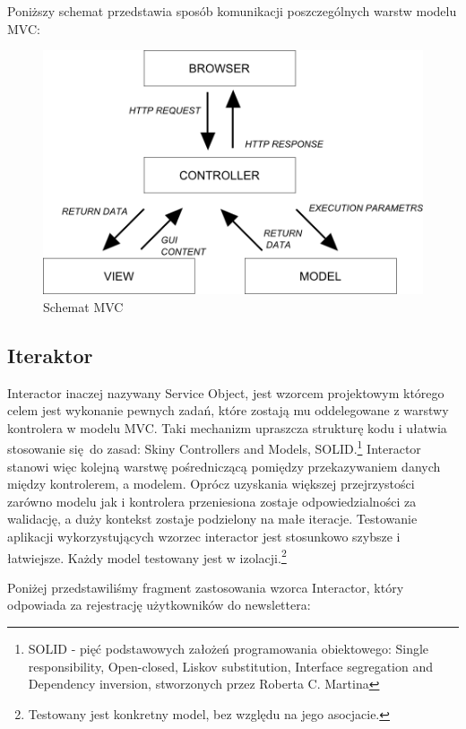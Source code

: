     Poniższy schemat przedstawia sposób komunikacji poszczególnych warstw modelu MVC:
    \begin{figure}[h]
      \centering
      \includegraphics[scale=0.87]{images/mvc_model.png}
      \caption{Schemat MVC}
    \end{figure}
  \subsection{Iteraktor}
  Interactor inaczej nazywany Service Object, jest wzorcem projektowym którego celem jest
  wykonanie pewnych zadań, które zostają mu oddelegowane z warstwy kontrolera w modelu MVC. Taki mechanizm upraszcza strukturę kodu i ułatwia stosowanie się do zasad: Skiny Controllers and Models, SOLID.\footnote{SOLID - pięć podstawowych założeń programowania obiektowego: Single responsibility, Open-closed, Liskov substitution, Interface segregation and Dependency inversion,  stworzonych przez Roberta C. Martina}
  Interactor stanowi więc kolejną warstwę pośredniczącą pomiędzy przekazywaniem danych między kontrolerem, a modelem. Oprócz uzyskania większej przejrzystości zarówno modelu jak i kontrolera przeniesiona zostaje odpowiedzialności za walidację, a duży kontekst zostaje podzielony na małe iteracje. Testowanie aplikacji wykorzystujących wzorzec interactor jest stosunkowo szybsze i łatwiejsze. Każdy model testowany jest w izolacji.\footnote{Testowany jest konkretny model, bez względu na jego asocjacie.}

  Poniżej przedstawiliśmy fragment zastosowania wzorca Interactor, który odpowiada za rejestrację użytkowników do newslettera:\\
  
